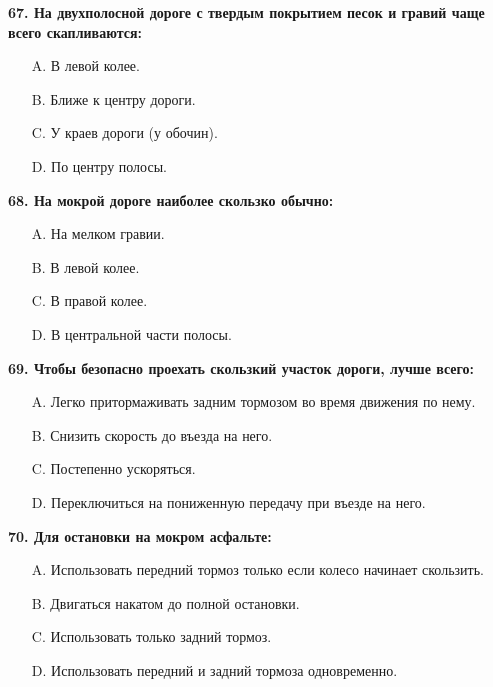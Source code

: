 \begin{minipage}{\linewidth}
\vspace{1em}\noindent\textbf{67. На двухполосной дороге с твердым покрытием песок и гравий чаще всего скапливаются:}

\begin{itemize}[nosep,leftmargin=2em]
\item [A.] В левой колее.
\item [B.] Ближе к центру дороги.
\item [C.] У краев дороги (у обочин).
\item [D.] По центру полосы.

\end{itemize}
\end{minipage}


\begin{minipage}{\linewidth}
\vspace{1em}\noindent\textbf{68. На мокрой дороге наиболее скользко обычно:}

\begin{itemize}[nosep,leftmargin=2em]
\item [A.] На мелком гравии.
\item [B.] В левой колее.
\item [C.] В правой колее.
\item [D.] В центральной части полосы.

\end{itemize}
\end{minipage}


\begin{minipage}{\linewidth}
\vspace{1em}\noindent\textbf{69. Чтобы безопасно проехать скользкий участок дороги, лучше всего:}

\begin{itemize}[nosep,leftmargin=2em]
\item [A.] Легко притормаживать задним тормозом во время движения по нему.
\item [B.] Снизить скорость до въезда на него.
\item [C.] Постепенно ускоряться.
\item [D.] Переключиться на пониженную передачу при въезде на него.

\end{itemize}
\end{minipage}


\begin{minipage}{\linewidth}
\vspace{1em}\noindent\textbf{70. Для остановки на мокром асфальте:}

\begin{itemize}[nosep,leftmargin=2em]
\item [A.] Использовать передний тормоз только если колесо начинает скользить.
\item [B.] Двигаться накатом до полной остановки.
\item [C.] Использовать только задний тормоз.
\item [D.] Использовать передний и задний тормоза одновременно.

\end{itemize}
\end{minipage}


